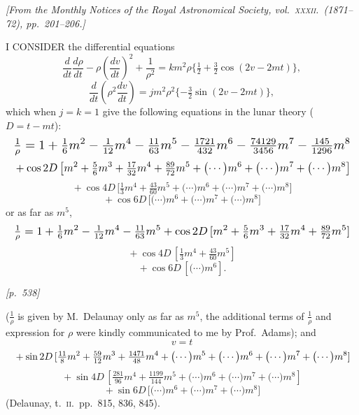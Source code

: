 \documentclass[11pt]{article}
\begin{document}
\medskip

\noindent\textit{[From the Monthly Notices of the Royal Astronomical
Society, vol.~\textsc{xxxii}.\ (1871--72), pp.~201--206.]}

\bigskip

I CONSIDER the differential equations
\[
\frac{d}{dt}\frac{d\rho}{dt}-\rho\left(\frac{dv}{dt}\right)^2+\frac{1}{\rho^2}=km^2\rho\{\tfrac{1}{2}+\tfrac{3}{2}\cos(2v-2mt)\},
\]
\[
\frac{d}{dt}\left(\rho^2\frac{dv}{dt}\right)=jm^2\rho^2\{-\tfrac{3}{2}\sin(2v-2mt)\},
\]
which when $j=k=1$ give the following equations in the lunar theory
($D=t-mt$):
\[
\resizebox{\textwidth}{!}{$\displaystyle\tfrac{1}{\rho}=1+\tfrac{1}{6}m^2-\tfrac{1}{12}m^4-\tfrac{11}{63}m^5-\tfrac{1721}{432}m^6-\tfrac{74129}{3456}m^7-\tfrac{145}{1296}m^8$}
\]
\[
\resizebox{\textwidth}{!}{$\displaystyle{}+\cos 2D\,\bigl[m^2+\tfrac{5}{6}m^3+\tfrac{17}{32}m^4+\tfrac{89}{72}m^5+\bigl(\cdots\bigr)m^6+\bigl(\cdots\bigr)m^7+\bigl(\cdots\bigr)m^8\bigr]$}
\]
\[
{}+\cos 4D\,\bigl[\tfrac{1}{3}m^4+\tfrac{43}{60}m^5+\bigl(\cdots\bigr)m^6+\bigl(\cdots\bigr)m^7+\bigl(\cdots\bigr)m^8\bigr]
\]
\[
{}+\cos 6D\,\bigl[\bigl(\cdots\bigr)m^6+\bigl(\cdots\bigr)m^7+\bigl(\cdots\bigr)m^8\bigr]
\]
or as far as $m^5$,
\[
\resizebox{\textwidth}{!}{$\displaystyle\tfrac{1}{\rho}=1+\tfrac{1}{6}m^2-\tfrac{1}{12}m^4-\tfrac{11}{63}m^5+\cos 2D\,[m^2+\tfrac{5}{6}m^3+\tfrac{17}{32}m^4+\tfrac{89}{72}m^5]$}
\]
\[
{}+\cos 4D\,[\tfrac{1}{3}m^4+\tfrac{43}{60}m^5]
\]
\[
{}+\cos 6D\,[\bigl(\cdots\bigr)m^6].
\]


\bigskip
\noindent\textit{[p.~538]}

\medskip

($\tfrac{1}{\rho}$ is given by M.~Delaunay only as far as $m^5$, the
additional terms of $\tfrac{1}{\rho}$ and expression for $\rho$ were
kindly communicated to me by Prof.\ Adams); and
\[
v=t
\]
\[
\resizebox{\textwidth}{!}{$\displaystyle{}+\sin 2D\,[\tfrac{11}{8}m^2+\tfrac{59}{12}m^3+\tfrac{1471}{48}m^4+\bigl(\cdots\bigr)m^5+\bigl(\cdots\bigr)m^6+\bigl(\cdots\bigr)m^7+\bigl(\cdots\bigr)m^8]$}
\]
\[
{}+\sin 4D\,[\tfrac{281}{96}m^4+\tfrac{1199}{144}m^5+\bigl(\cdots\bigr)m^6+\bigl(\cdots\bigr)m^7+\bigl(\cdots\bigr)m^8]
\]
\[
{}+\sin 6D\,\bigl[\bigl(\cdots\bigr)m^6+\bigl(\cdots\bigr)m^7+\bigl(\cdots\bigr)m^8\bigr]
\]
(Delaunay, t.~\textsc{ii}.\ pp.~815, 836, 845).

\medskip
\end{document}
